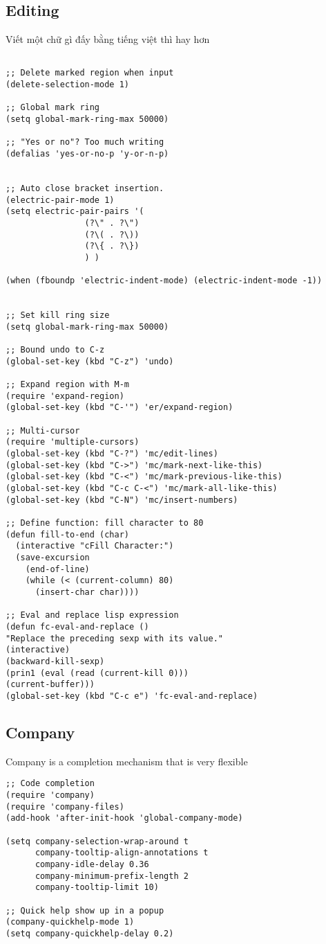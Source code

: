\documentclass[11pt]{article}
\begin{document}
\subsection{Editing}
\label{sec:org271f9f0}
Viết một chữ gì đấy bằng tiếng việt thì hay hơn
\begin{verbatim}

;; Delete marked region when input
(delete-selection-mode 1)

;; Global mark ring
(setq global-mark-ring-max 50000)

;; "Yes or no"? Too much writing
(defalias 'yes-or-no-p 'y-or-n-p)


;; Auto close bracket insertion.
(electric-pair-mode 1)
(setq electric-pair-pairs '(
			    (?\" . ?\")
			    (?\( . ?\))
			    (?\{ . ?\})
			    ) )

(when (fboundp 'electric-indent-mode) (electric-indent-mode -1))


;; Set kill ring size
(setq global-mark-ring-max 50000)

;; Bound undo to C-z
(global-set-key (kbd "C-z") 'undo)

;; Expand region with M-m
(require 'expand-region)
(global-set-key (kbd "C-'") 'er/expand-region)

;; Multi-cursor
(require 'multiple-cursors)
(global-set-key (kbd "C-?") 'mc/edit-lines)
(global-set-key (kbd "C->") 'mc/mark-next-like-this)
(global-set-key (kbd "C-<") 'mc/mark-previous-like-this)
(global-set-key (kbd "C-c C-<") 'mc/mark-all-like-this)
(global-set-key (kbd "C-N") 'mc/insert-numbers)

;; Define function: fill character to 80
(defun fill-to-end (char)
  (interactive "cFill Character:")
  (save-excursion
    (end-of-line)
    (while (< (current-column) 80)
      (insert-char char))))

;; Eval and replace lisp expression
(defun fc-eval-and-replace ()
"Replace the preceding sexp with its value."
(interactive)
(backward-kill-sexp)
(prin1 (eval (read (current-kill 0)))
(current-buffer)))
(global-set-key (kbd "C-c e") 'fc-eval-and-replace)

\end{verbatim}

\subsection{Company}
\label{sec:orgc03d443}
Company is a completion mechanism that is very flexible

\begin{verbatim}
;; Code completion
(require 'company)
(require 'company-files)
(add-hook 'after-init-hook 'global-company-mode)

(setq company-selection-wrap-around t
      company-tooltip-align-annotations t
      company-idle-delay 0.36
      company-minimum-prefix-length 2
      company-tooltip-limit 10)

;; Quick help show up in a popup
(company-quickhelp-mode 1)
(setq company-quickhelp-delay 0.2)

\end{verbatim}
\end{document}
